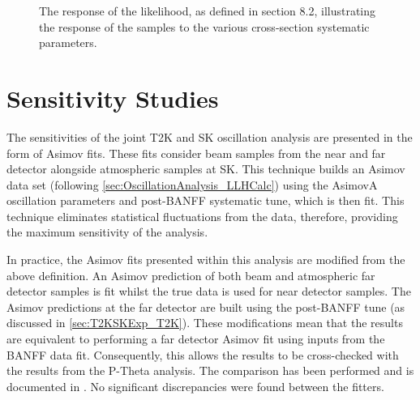 \begin{figure}[h]
\begin{subfigure}[t]{0.5\textwidth}
  \end{subfigure}
  \caption{The response of the likelihood, as defined in section 8.2, illustrating the response of the samples to the various cross-section systematic parameters.}
  \label{fig:OscillationAnalysis_LLHScanSystPars}
\end{figure}

\clearpage
\section{Sensitivity Studies}
\label{sec:OscillationAnalysis_Sensitivities}


The sensitivities of the joint T2K and SK oscillation analysis are presented in the form of Asimov fits. These fits consider beam samples from the near and far detector alongside atmospheric samples at SK. This technique builds an Asimov data set (following \autoref{sec:OscillationAnalysis_LLHCalc}) using the AsimovA oscillation parameters and post-BANFF systematic tune, which is then fit. This technique eliminates statistical fluctuations from the data, therefore, providing the maximum sensitivity of the analysis.

In practice, the Asimov fits presented within this analysis are modified from the above definition. An Asimov prediction of both beam and atmospheric far detector samples is fit whilst the true data is used for near detector samples. The Asimov predictions at the far detector are built using the post-BANFF tune (as discussed in \autoref{sec:T2KSKExp_T2K}). These modifications mean that the results are equivalent to performing a far detector Asimov fit using inputs from the BANFF data fit. Consequently, this allows the results to be cross-checked with the results from the P-Theta analysis. The comparison has been performed and is documented in \cite{barrow_M3_PT_Comp}. No significant discrepancies were found between the fitters.

